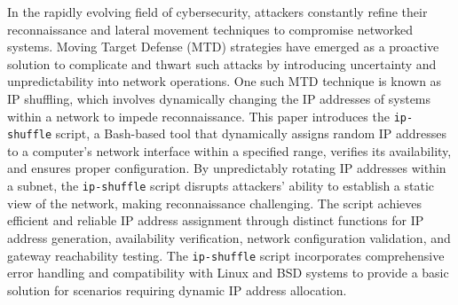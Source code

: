 In the rapidly evolving field of cybersecurity, attackers constantly refine their reconnaissance and lateral movement techniques to compromise networked systems. Moving Target Defense (MTD) strategies have emerged as a proactive solution to complicate and thwart such attacks by introducing uncertainty and unpredictability into network operations.
One such MTD technique is known as IP shuffling, which involves dynamically changing the IP addresses of systems within a network to impede reconnaissance. This paper introduces the \texttt{ip-shuffle} script, a Bash-based tool that dynamically assigns random IP addresses to a computer’s network interface within a specified range, verifies its availability, and ensures proper configuration. By unpredictably rotating IP addresses within a subnet, the \texttt{ip-shuffle} script disrupts attackers’ ability to establish a static view of the network, making reconnaissance challenging. The script achieves efficient and reliable IP address assignment through distinct functions for IP address generation, availability verification, network configuration validation, and gateway reachability testing. The \texttt{ip-shuffle} script incorporates comprehensive error handling and compatibility with Linux and BSD systems to provide a basic solution for scenarios requiring dynamic IP address allocation.
